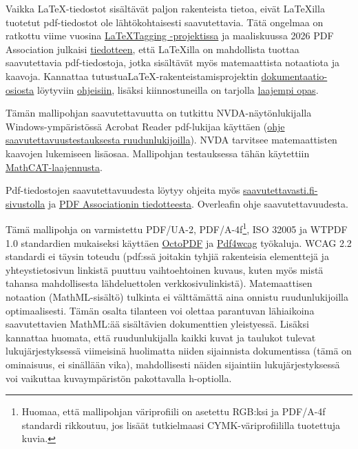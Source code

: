 \documentclass[finnish, manual, a4paper]{csthesis}
\begin{document}
Vaikka \LaTeX{}-tiedostot sisältävät paljon rakenteista tietoa, eivät \LaTeX{}illa tuotetut pdf-tiedostot ole lähtökohtaisesti saavutettavia. Tätä ongelmaa on ratkottu viime vuosina \href{https://latex3.github.io/tagging-project/}{\LaTeX Tagging -projektissa}
ja maaliskuussa 2026 PDF Association julkaisi \href{https://pdfa.org/accessible-math-in-pdf-finally/}{tiedotteen}, että LaTeXilla on mahdollista tuottaa saavutettavia pdf-tiedostoja, jotka sisältävät myös matemaattista notaatiota ja kaavoja.
 Kannattaa tutustua\LaTeX{}-rakenteistamis\-pro\-jektin 
\href{https://latex3.github.io/tagging-project/documentation/}{dokumentaatio-osiosta} löytyviin \href{https://latex3.github.io/tagging-project/documentation/usage-instructions}{ohjeisiin}, lisäksi kiinnostuneilla on tarjolla \href{https://latex3.github.io/tagging-project/documentation/wtpdf/fulldoc}{laajempi opas}. 


Tämän mallipohjan saavutettavuutta on tutkittu NVDA-näytönlukijalla Windows-ym\-pä\-ris\-tössä Acrobat Reader pdf-lukijaa käyttäen (\href{https://helpdesk.it.helsinki.fi/help/20057}{ohje saavutettavuustestauksesta ruudunlukijoilla}). NVDA tarvitsee matemaattisten kaavojen lukemiseen lisäosaa. Mallipohjan testauksessa tähän käytettiin \href{https://addons.nvda-project.org/addons/MathCAT.en.html}{MathCAT-laajennusta}.

Pdf-tiedostojen saavutettavuudesta löytyy ohjeita myös  \href{https://www.saavutettavasti.fi/saavutettavat-asiakirjat/pdf/}{saavutettavasti.fi-sivustolla} ja \href{https://pdfa.org/accessible-math-in-pdf-finally/}{PDF Associationin tiedotteesta}. Overleafin ohje saavutettavuudesta.

Tämä mallipohja on varmistettu PDF/UA-2, PDF/A-4f\footnote{Huomaa, että mallipohjan väriprofiili on asetettu RGB:ksi ja PDF/A-4f standardi rikkoutuu, jos lisäät tutkielmaasi CYMK-väriprofiililla tuotettuja kuvia.}, ISO 32005 ja WTPDF 1.0
standardien mukaiseksi käyttäen \href{https://octopdf.com}{OctoPDF} ja \href{https://pdf4wcag.com}{Pdf4wcag} työkaluja.  WCAG 2.2 standardi ei täysin toteudu (pdf:ssä joitakin tyhjiä rakenteisia elementtejä ja yhteystietosivun linkistä puuttuu vaihtoehtoinen kuvaus, kuten myös mistä tahansa mahdollisesta lähdeluettolen verkkosivulinkistä). Matemaattisen notaation (MathML-sisältö) tulkinta ei välttämättä aina onnistu ruudunlukijoilla optimaalisesti. Tämän osalta tilanteen voi olettaa parantuvan lähiaikoina saavutettavien MathML:ää sisältävien dokumenttien yleistyessä. Lisäksi kannattaa huomata, että ruudunlukijalla kaikki kuvat ja taulukot tulevat lukujärjestyksessä viimeisinä huolimatta niiden sijainnista dokumentissa (tämä on ominaisuus, ei sinällään vika), mahdollisesti näiden sijaintiin lukujärjestyksessä voi vaikuttaa kuvaympäristön pakottavalla h-optiolla.
\end{document}
